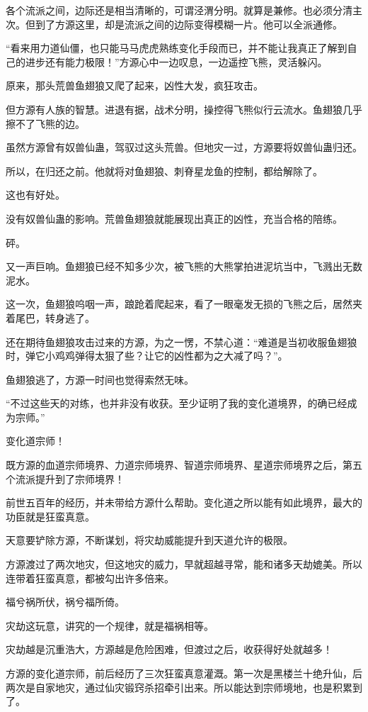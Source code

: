 \begin{this_body}
各个流派之间，边际还是相当清晰的，可谓泾渭分明。就算是兼修。也必须分清主次。但到了方源这里，却是流派之间的边际变得模糊一片。他可以全派通修。

“看来用力道仙僵，也只能马马虎虎熟练变化手段而已，并不能让我真正了解到自己的进步还有能力极限！”方源心中一边叹息，一边遥控飞熊，灵活躲闪。

原来，那头荒兽鱼翅狼又爬了起来，凶性大发，疯狂攻击。

但方源有人族的智慧。进退有据，战术分明，操控得飞熊似行云流水。鱼翅狼几乎擦不了飞熊的边。

虽然方源曾有奴兽仙蛊，驾驭过这头荒兽。但地灾一过，方源要将奴兽仙蛊归还。

所以，在归还之前。他就将对鱼翅狼、刺脊星龙鱼的控制，都给解除了。

这也有好处。

没有奴兽仙蛊的影响。荒兽鱼翅狼就能展现出真正的凶性，充当合格的陪练。

砰。

又一声巨响。鱼翅狼已经不知多少次，被飞熊的大熊掌拍进泥坑当中，飞溅出无数泥水。

这一次，鱼翅狼呜咽一声，踉跄着爬起来，看了一眼毫发无损的飞熊之后，居然夹着尾巴，转身逃了。

还在期待鱼翅狼攻击过来的方源，为之一愣，不禁心道：“难道是当初收服鱼翅狼时，弹它小鸡鸡弹得太狠了些？让它的凶性都为之大减了吗？”。

鱼翅狼逃了，方源一时间也觉得索然无味。

“不过这些天的对练，也并非没有收获。至少证明了我的变化道境界，的确已经成为宗师。”

变化道宗师！

既方源的血道宗师境界、力道宗师境界、智道宗师境界、星道宗师境界之后，第五个流派提升到了宗师境界！

前世五百年的经历，并未带给方源什么帮助。变化道之所以能有如此境界，最大的功臣就是狂蛮真意。

天意要铲除方源，不断谋划，将灾劫威能提升到天道允许的极限。

方源渡过了两次地灾，但这地灾的威力，早就超越寻常，能和诸多天劫媲美。所以连带着狂蛮真意，都被勾出许多倍来。

福兮祸所伏，祸兮福所倚。

灾劫这玩意，讲究的一个规律，就是福祸相等。

灾劫越是沉重浩大，方源越是危险困难，但渡过之后，收获得好处就越多！

方源的变化道宗师，前后经历了三次狂蛮真意灌溉。第一次是黑楼兰十绝升仙，后两次是自家地灾，通过仙灾锻窍杀招牵引出来。所以能达到宗师境地，也是积累到了。


\end{this_body}
